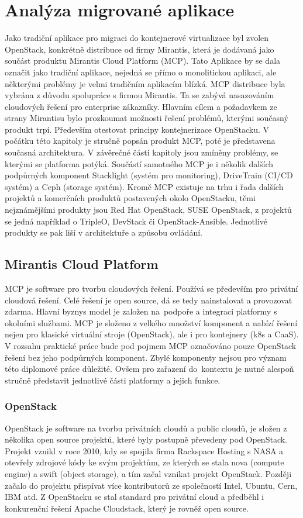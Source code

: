 \chapter{Analýza migrované aplikace}\label{sec:chap4}
Jako tradiční aplikace pro migraci do kontejnerové virtualizace byl zvolen OpenStack, konkrétně distribuce od firmy Mirantis, která je dodávaná jako součást produktu Mirantis Cloud Platform (MCP). Tato Aplikace by se dala označit jako tradiční aplikace, nejedná se přímo o monolitickou aplikaci, ale některými problémy je velmi tradičním aplikacím blízká. MCP distribuce byla vybrána z důvodu spolupráce s firmou Mirantis. Ta se zabývá nasazováním cloudových řešení pro enterprise zákazníky. Hlavním cílem a požadavkem ze strany Mirantisu bylo prozkoumat možnosti řešení problémů, kterými současný produkt trpí. Především otestovat principy kontejnerizace OpenStacku. V počátku této kapitoly je stručně popsán produkt MCP, poté je představena současná architektura. V závěrečné části kapitoly jsou zmíněny problémy, se kterými se platforma potýká. Součástí samotného MCP je i několik dalších podpůrných komponent Stacklight (systém pro monitoring), DriveTrain (CI/CD systém) a Ceph (storage systém). Kromě MCP existuje na trhu i řada dalších projektů a komerčních produktů postavených okolo OpenStacku, těmi nejznámějšími produkty jsou Red Hat OpenStack, SUSE OpenStack, z projektů se jedná například o TripleO, DevStack či OpenStack-Ansible. Jednotlivé produkty se pak liší v architektuře a způsobu ovládání.

\section{Mirantis Cloud Platform}
MCP je software pro tvorbu cloudových řešení. Používá se především pro privátní cloudová řešení. Celé řešení je open source, dá se tedy nainstalovat a provozovat zdarma. Hlavní byznys model je založen na podpoře a integraci platformy s okolními službami. MCP je složeno z velkého množství komponent a nabízí řešení nejen pro klasické virtuální stroje (OpenStack), ale i pro kontejnery (k8s a CaaS). V rozsahu praktické práce bude pod pojmem MCP označováno pouze OpenStack řešení bez jeho podpůrných komponent. Zbylé komponenty nejsou pro význam této diplomové práce důležité. Ovšem pro zařazení do kontextu je nutné alespoň stručně představit jednotlivé části platformy a jejich funkce.

\subsection{OpenStack}
OpenStack je software na tvorbu privátních cloudů a public cloudů, je složen z několika open source projektů, které byly postupně převedeny pod OpenStack. Projekt vznikl v roce 2010, kdy se spojila firma Rackspace Hosting s NASA a otevřely zdrojové kódy \cite{nasa_nova} ke svým projektům, ze kterých se stala nova (compute engine) a swift (object storage), a tím začal vznikat projekt OpenStack. Později začalo do projektu přispívat více kontributorů ze společností Intel, Ubuntu, Cern, IBM atd. Z OpenStacku se stal standard pro privátní cloud a předběhl i konkurenční řešení Apache Cloudstack, který je rovněž open source.

